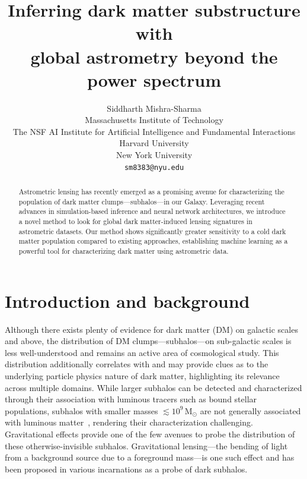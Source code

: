 \documentclass[]{article}
\title{Inferring dark matter substructure with \\ global astrometry beyond the power spectrum}
\author{
Siddharth Mishra-Sharma \\
Massachusetts Institute of Technology \\
The NSF AI Institute for Artificial Intelligence and Fundamental Interactions \\
Harvard University \\ 
New York University \\
\texttt{sm8383@nyu.edu} \\
}
\begin{document}
\maketitle

\begin{abstract}
Astrometric lensing has recently emerged as a promising avenue for characterizing the population of dark matter clumps---subhalos---in our Galaxy. Leveraging recent advances in simulation-based inference and neural network architectures, we introduce a novel method to look for global dark matter-induced lensing signatures in astrometric datasets. Our method shows significantly greater sensitivity to a cold dark matter population compared to existing approaches, establishing machine learning as a powerful tool for characterizing dark matter using astrometric data. 
\end{abstract}

\section{Introduction and background}
\label{sec:intro}

Although there exists plenty of evidence for dark matter (DM) on galactic scales and above,
the distribution of DM clumps---subhalos---on sub-galactic scales is less well-understood and remains an active area of cosmological study. This distribution additionally correlates with and may provide clues as to the underlying particle physics nature of dark matter, highlighting its relevance across multiple domains. 
%
While larger subhalos can be detected and characterized through their association with luminous tracers such as bound stellar populations, subhalos with smaller masses $\lesssim 10^9\,\mathrm M_\odot$ are not generally associated with luminous matter~\cite{Fitts:2016usl,2017MNRAS.467.2019R}, rendering their characterization challenging. Gravitational effects provide one of the few avenues to probe the distribution of these otherwise-invisible subhalos. Gravitational lensing---the bending of light from a background source due to a foreground mass---is one such effect and has been proposed in various incarnations as a probe of dark subhalos. 
\end{document}
